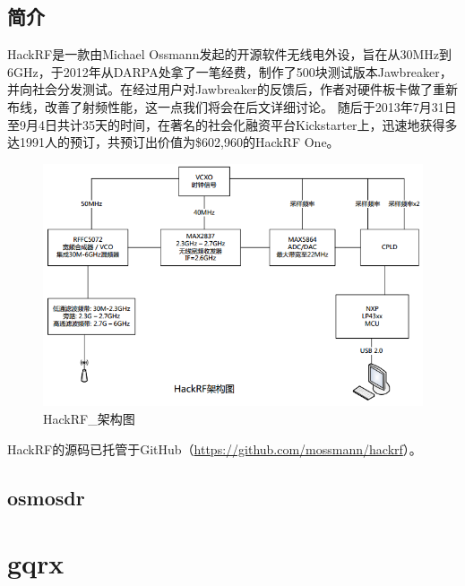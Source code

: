 		\subsection{简介}
			\par HackRF是一款由Michael Ossmann发起的开源软件无线电外设，旨在从30MHz到6GHz，于2012年从DARPA处拿了一笔经费，制作了500块测试版本Jawbreaker，并向社会分发测试。在经过用户对Jawbreaker的反馈后，作者对硬件板卡做了重新布线，改善了射频性能，这一点我们将会在后文详细讨论。 随后于2013年7月31日至9月4日共计35天的时间，在著名的社会化融资平台Kickstarter上，迅速地获得多达1991人的预订，共预订出价值为\$602,960的HackRF One。
			\begin{figure}[htb]
				\centering
				\includegraphics[width=13cm]{figures/HackRF_Schematic.png}
				\caption{HackRF\_架构图}
				\label{fig:HackRF_架构}
			\end{figure}
			\par HackRF的源码已托管于GitHub（\href{https://github.com/mossmann/hackrf}{https://github.com/mossmann/hackrf}）。
		\subsection{osmosdr}
	\section{gqrx}
